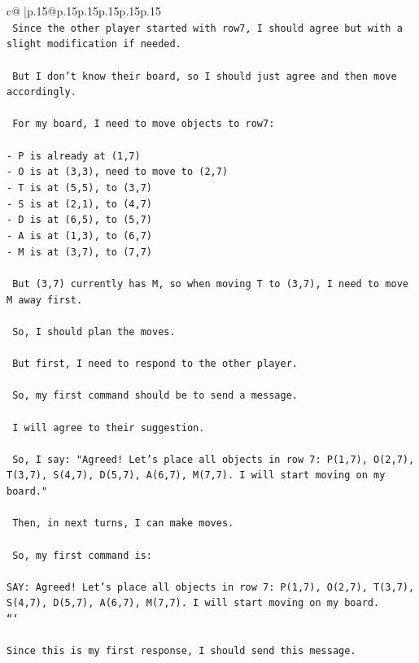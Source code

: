\documentclass{article}
\begin{document}
{\begin{supertabular}{c@{$\;$}|p{.15\linewidth}@{}p{.15\linewidth}p{.15\linewidth}p{.15\linewidth}p{.15\linewidth}p{.15\linewidth}}
{{{\\ 
\texttt{ Since the other player started with row7, I should agree but with a slight modification if needed.} \\
\\ 
\texttt{ But I don't know their board, so I should just agree and then move accordingly.} \\
\\ 
\texttt{ For my board, I need to move objects to row7:} \\
\\ 
\texttt{{-} P is already at (1,7)} \\
\texttt{{-} O is at (3,3), need to move to (2,7)} \\
\texttt{{-} T is at (5,5), to (3,7)} \\
\texttt{{-} S is at (2,1), to (4,7)} \\
\texttt{{-} D is at (6,5), to (5,7)} \\
\texttt{{-} A is at (1,3), to (6,7)} \\
\texttt{{-} M is at (3,7), to (7,7)} \\
\\ 
\texttt{ But (3,7) currently has M, so when moving T to (3,7), I need to move M away first.} \\
\\ 
\texttt{ So, I should plan the moves.} \\
\\ 
\texttt{ But first, I need to respond to the other player.} \\
\\ 
\texttt{ So, my first command should be to send a message.} \\
\\ 
\texttt{ I will agree to their suggestion.} \\
\\ 
\texttt{ So, I say: "Agreed! Let's place all objects in row 7: P(1,7), O(2,7), T(3,7), S(4,7), D(5,7), A(6,7), M(7,7). I will start moving on my board."} \\
\\ 
\texttt{ Then, in next turns, I can make moves.} \\
\\ 
\texttt{ So, my first command is:} \\
\\ 
\texttt{SAY: Agreed! Let's place all objects in row 7: P(1,7), O(2,7), T(3,7), S(4,7), D(5,7), A(6,7), M(7,7). I will start moving on my board.} \\
\texttt{```} \\
\\ 
\texttt{Since this is my first response, I should send this message.} \\
            }
        }
    }
     \\ \\


\end{supertabular}}
\end{document}
